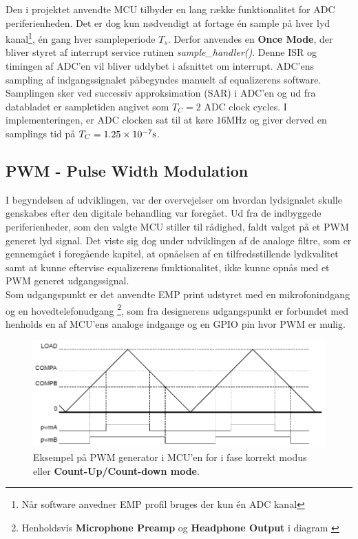 Den i projektet anvendte MCU tilbyder en lang række funktionalitet for ADC periferienheden.
Det er dog kun nødvendigt at fortage én sample på hver lyd kanal\footnote{Når software anvedner EMP profil bruges der kun én ADC kanal}, én gang hver sampleperiode $T_s$.
Derfor anvendes en \textbf{Once Mode}, der bliver styret af interrupt service rutinen \textit{sample\_handler()}. Denne ISR og timingen af ADC'en vil bliver uddybet i afsnittet om interrupt.
ADC'ens sampling af indgangssignalet påbegyndes manuelt af equalizerens software.
Samplingen sker ved successiv approksimation (SAR) i ADC'en og ud fra databladet er sampletiden angivet som  $T_C = 2$ ADC clock cycles. 
I implementeringen, er ADC clocken sat til at køre $16 \si{\mega\hertz}$ og giver derved en samplings tid på $T_C = \num{1,25E-7}\si{\second}$.  

\subsection{PWM - Pulse Width Modulation}
I begyndelsen af udviklingen, var der overvejelser om hvordan lydsignalet skulle genskabes efter den digitale behandling var foregået.
Ud fra de indbyggede periferienheder, som den valgte MCU stiller til rådighed, faldt valget på et PWM generet lyd signal.
Det viste sig dog under udviklingen af de analoge filtre, som er gennemgået i foregående kapitel, at opnåelsen af en tilfredsstillende lydkvalitet samt at kunne eftervise equalizerens funktionalitet, ikke kunne opnås med et PWM generet udgangssignal. 
\\

Som udgangspunkt er det anvendte EMP print udstyret med en mikrofonindgang og en hovedtelefonudgang \footnote{Henholdsvis \textbf{Microphone Preamp} og \textbf{Headphone Output} i diagram \cite{emp-diagram}}, som fra designerens udgangspunkt er forbundet med henholds en af MCU'ens analoge indgange og en GPIO pin hvor PWM er mulig.

\begin{figure}[h!]
	\centering
	\includegraphics[width=.7\textwidth]{billeder/pwm.png}
	\caption{Eksempel på PWM generator i MCU'en for i fase korrekt modus eller \textbf{Count-Up/Count-down mode}\cite[Fig. 20-5 s. 1232]{tm4c123gh6pm}.}
	\label{fig:pwm}
\end{figure}

